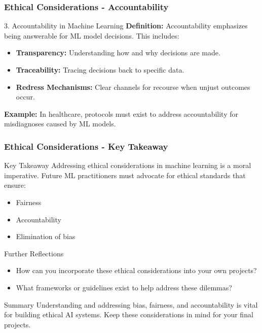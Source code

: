 \documentclass{beamer}
\begin{document}
\begin{frame}[fragile]
    \frametitle{Ethical Considerations - Accountability}
    \begin{block}{3. Accountability in Machine Learning}
        \textbf{Definition:} Accountability emphasizes being answerable for ML model decisions. This includes:
        \begin{itemize}
            \item \textbf{Transparency:} Understanding how and why decisions are made.
            \item \textbf{Traceability:} Tracing decisions back to specific data.
            \item \textbf{Redress Mechanisms:} Clear channels for recourse when unjust outcomes occur.
        \end{itemize}
        
        \textbf{Example:} In healthcare, protocols must exist to address accountability for misdiagnoses caused by ML models.
    \end{block}
\end{frame}

\begin{frame}[fragile]
    \frametitle{Ethical Considerations - Key Takeaway}
    \begin{block}{Key Takeaway}
        Addressing ethical considerations in machine learning is a moral imperative. Future ML practitioners must advocate for ethical standards that ensure:
        \begin{itemize}
            \item Fairness
            \item Accountability
            \item Elimination of bias
        \end{itemize}
    \end{block}
    
    \begin{block}{Further Reflections}
        \begin{itemize}
            \item How can you incorporate these ethical considerations into your own projects?
            \item What frameworks or guidelines exist to help address these dilemmas?
        \end{itemize}
    \end{block}
    
    \begin{block}{Summary}
        Understanding and addressing bias, fairness, and accountability is vital for building ethical AI systems. Keep these considerations in mind for your final projects.
    \end{block}
\end{frame}
\end{document}
